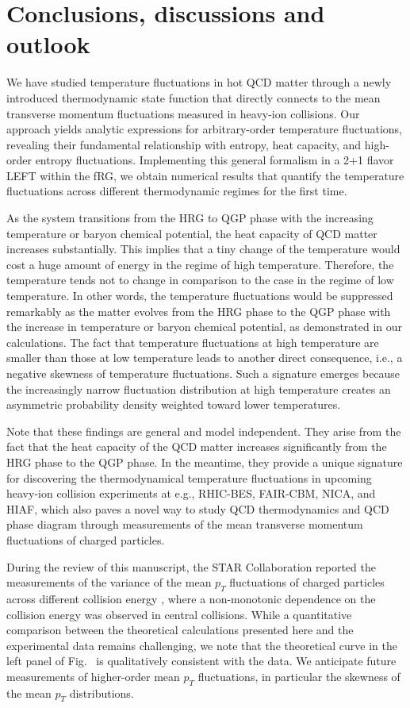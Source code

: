 \documentclass[aps,twocolumn,prd,superscriptaddress,nofootinbib,floatfix]{revtex4-2}
\def\Fig#1{Fig.~\labelcref{#1}}
\begin{document}
\section{Conclusions, discussions and outlook}
\label{sec:conclusion} 

We have studied temperature fluctuations in hot QCD matter through a newly introduced thermodynamic state function that directly connects to the mean transverse momentum fluctuations measured in heavy-ion collisions. Our approach yields analytic expressions for arbitrary-order temperature fluctuations, revealing their fundamental relationship with entropy, heat capacity, and high-order entropy fluctuations. Implementing this general formalism in a 2+1 flavor LEFT within the fRG, we obtain numerical results that quantify the temperature fluctuations across different thermodynamic regimes for the first time.

As the system transitions from the HRG to QGP phase with the increasing temperature or baryon chemical potential, the heat capacity of QCD matter increases substantially. This implies that a tiny change of the temperature would cost a huge amount of energy in the regime of high temperature. Therefore, the temperature tends not to change in comparison to the case in the regime of low temperature. In other words, the temperature fluctuations would be suppressed remarkably as the matter evolves from the HRG phase to the QGP phase with the increase in temperature or baryon chemical potential, as demonstrated in our calculations. The fact that temperature fluctuations at high temperature are smaller than those at low temperature leads to another direct consequence, i.e., a negative skewness of temperature fluctuations. Such a signature emerges because the increasingly narrow fluctuation distribution at high temperature creates an asymmetric probability density weighted toward lower temperatures. 

Note that these findings are general and model independent. They arise from the fact that the heat capacity of the QCD matter increases significantly from the HRG phase to the QGP phase. In the meantime, they provide a unique signature for discovering the thermodynamical temperature fluctuations in upcoming heavy-ion collision experiments at e.g., RHIC-BES, FAIR-CBM, NICA, and HIAF, which also paves a novel way to study QCD thermodynamics and QCD phase diagram through measurements of the mean transverse momentum fluctuations of charged particles.

During the review of this manuscript, the STAR Collaboration reported the measurements of the variance of the mean $p_T$ fluctuations of charged particles across different collision energy \cite{STAR:2026vjv}, where a non-monotonic dependence on the collision energy was observed in central collisions. While a quantitative comparison between the theoretical calculations presented here and the experimental data remains challenging, we note that the theoretical curve in the left panel of \Fig{fig:cnfreezeout} is qualitatively consistent with the data. We anticipate future measurements of higher-order mean $p_T$ fluctuations, in particular the skewness of the mean $p_T$ distributions.
\end{document}
